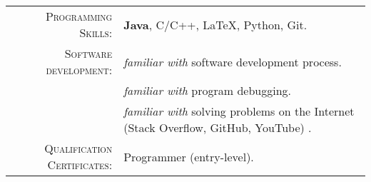 %
%


 
\renewcommand{\arraystretch}{1.1}

	\begin{tabular}{>{}r>{}p{13cm}} 
		\textsc{Programming Skills:}    &  \textbf{Java}, C/C++, \LaTeX, Python, Git.\\  
		\textsc{Software development:} 		&  \emph{familiar with} software development process.\\
										&  \emph{familiar with} program debugging.\\
										&  \emph{familiar with} solving problems on the Internet (Stack Overflow, GitHub, YouTube) .\\
		\textsc{Qualification Certificates:}			&  Programmer (entry-level).
	\end{tabular}